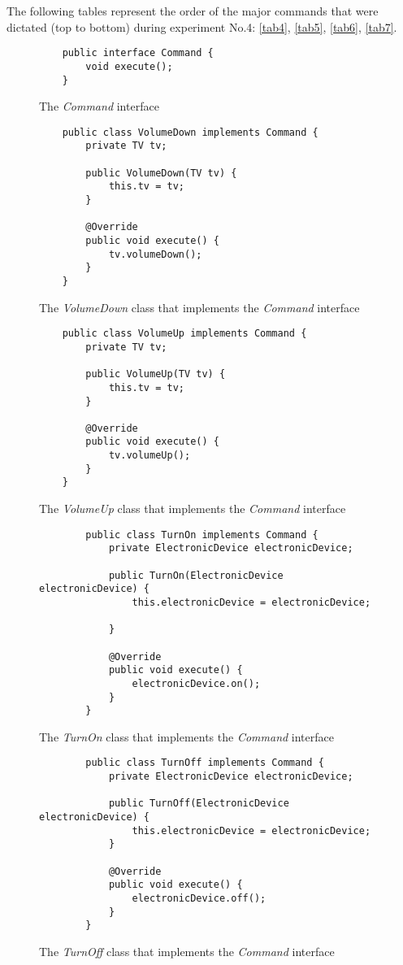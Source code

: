 The following tables represent the order of the major commands that were dictated (top to bottom) during experiment No.4: \autoref{tab4}, \autoref{tab5}, \autoref{tab6}, \autoref{tab7}.
\begin{figure}[H]
	\begin{lstlisting}
	public interface Command {
		void execute();
	}
	\end{lstlisting}
	\caption{The \textit{Command} interface}
	\label{fig7}
\end{figure}
\begin{figure}[H]
	\begin{lstlisting}
	public class VolumeDown implements Command {
		private TV tv;
		
		public VolumeDown(TV tv) {
			this.tv = tv;
		}
		
		@Override
		public void execute() {
			tv.volumeDown();
		}
	}
	\end{lstlisting}
	\caption{The \textit{VolumeDown} class that implements the \textit{Command} interface}
	\label{fig8}
\end{figure}
\begin{figure}[H]
	\begin{lstlisting}
	public class VolumeUp implements Command {
		private TV tv;
		
		public VolumeUp(TV tv) {
			this.tv = tv;
		}
		
		@Override
		public void execute() {
			tv.volumeUp();
		}
	}
	\end{lstlisting}
	\caption{The \textit{VolumeUp} class that implements the \textit{Command} interface}
	\label{fig9}
\end{figure}
\begin{figure}[H]
	\begin{lstlisting}
		public class TurnOn implements Command {
			private ElectronicDevice electronicDevice;
			
			public TurnOn(ElectronicDevice electronicDevice) {
				this.electronicDevice = electronicDevice;
			
			}
			
			@Override
			public void execute() {
				electronicDevice.on();
			}
		}
	\end{lstlisting}
	\caption{The \textit{TurnOn} class that implements the \textit{Command} interface}
	\label{fig10}
\end{figure}
\begin{figure}[H]
	\begin{lstlisting}
		public class TurnOff implements Command {
			private ElectronicDevice electronicDevice;
			
			public TurnOff(ElectronicDevice electronicDevice) {
				this.electronicDevice = electronicDevice;
			}
			
			@Override
			public void execute() {
				electronicDevice.off();
			}
		}
	\end{lstlisting}
	\caption{The \textit{TurnOff} class that implements the \textit{Command} interface}
	\label{fig11}
\end{figure}
